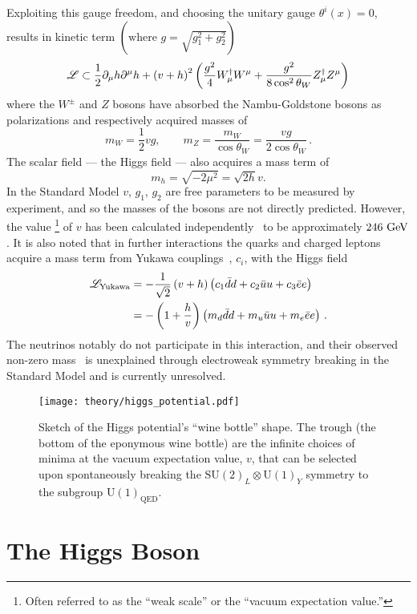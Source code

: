 Exploiting this gauge freedom, and choosing the unitary gauge $\theta^{i}(x)=0$, results in kinetic term $\left(\textrm{where } g = \sqrt{g_{1}^{2} + g_{2}^{2}}\right)$
\[
 \mathscr{L} \subset \frac{1}{2}\partial_{\mu} h \partial^{\mu} h + \left(v + h\right)^{2} \left(\frac{g^{2}}{4} W_{\mu}^{\dagger}W^{\mu} + \frac{g^{2}}{8 \cos^2 \theta_{W}} Z_{\mu}^{\dagger}Z^{\mu}\right)
\]
where the $W^{\pm}$ and $Z$ bosons have absorbed the Nambu-Goldstone bosons as polarizations and respectively acquired masses of
\[
 m_{W} = \frac{1}{2}vg, \qquad m_{Z} = \frac{m_{W}}{\cos\theta_{W}} = \frac{vg}{2\cos\theta_{W}}\,.
\]
The scalar field --- the Higgs field --- also acquires a mass term of
\[
 m_{h} = \sqrt{-2\mu^{2}} = \sqrt{2h}v.
\]
In the Standard Model $v$, $g_{1}$, $g_{2}$ are free parameters to be measured by experiment, and so the masses of the bosons are not directly predicted.
However, the value%
\footnote{Often referred to as the ``weak scale'' or the ``vacuum expectation value.''}
of $v$ has been calculated independently~\cite{Plehn:2005nk} to be approximately $246~\mathrm{GeV}$.
It is also noted that in further interactions the quarks and charged leptons acquire a mass term from Yukawa couplings~\cite{Yukawa:1935xg}, $c_i$, with the Higgs field
\[
 \begin{split}
  \mathscr{L}_{\textrm{Yukawa}} &= -\frac{1}{\sqrt{2}} \left(v+h\right) \left(c_{1}\bar{d}d + c_{2}\bar{u}u + c_{3}\bar{e}e\right) \\
  &= - \left(1 + \frac{h}{v}\right)\left(m_{d}\bar{d}d + m_{u}\bar{u}u + m_{e}\bar{e}e\right)\,.
 \end{split}
\]
The neutrinos notably do not participate in this interaction, and their observed non-zero mass~\cite{Ahmad:2001an} is unexplained through electroweak symmetry breaking in the Standard Model and is currently unresolved.

\begin{figure}[htbp]
 \centering
 \texttt{[image: theory/higgs\_potential.pdf]}
 \caption[Sketch of the Higgs potential shape.]{%
 Sketch of the Higgs potential's ``wine bottle'' shape.
 The trough (the bottom of the eponymous wine bottle) are the infinite choices of minima at the vacuum expectation value, $v$, that can be selected upon spontaneously breaking the $\mathrm{SU}(2)_{L} \otimes \mathrm{U}(1)_{Y}$ symmetry to the subgroup $\mathrm{U}(1)_{\textrm{QED}}$.}
 \label{fig:Higgs_potential}
\end{figure}

\section{The Higgs Boson}\label{section:Higgs_boson}

